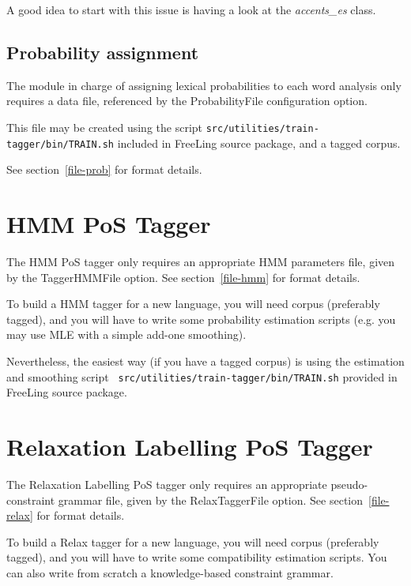 \documentclass[a4paper]{book}
\begin{document}
    A good idea to start with this issue is having a look at the 
    {\em accents\_es} class.

   \subsection{Probability assignment} 

     The module in charge of assigning lexical probabilities to each
    word analysis only requires a data file, referenced by the 
    ProbabilityFile configuration option. 

     This file may be created using the script
     {\tt src/utilities/train-tagger/bin/TRAIN.sh} included in
     FreeLing source package, and a tagged corpus.

    See section~\ref{file-prob} for format details.

  \section{HMM PoS Tagger}

   The HMM PoS tagger only requires an appropriate HMM parameters file, 
   given by the TaggerHMMFile option. See section~\ref{file-hmm}
   for format details.
 
   To build a HMM tagger for a new language, you will need corpus 
   (preferably tagged), and you will have to write some probability 
   estimation scripts (e.g. you may use MLE with a simple add-one 
   smoothing).

   Nevertheless, the easiest way (if you have a tagged corpus) is
   using the estimation and smoothing script {\tt
   src/utilities/train-tagger/bin/TRAIN.sh} provided in FreeLing source package.

  \section{Relaxation Labelling PoS Tagger}

   The Relaxation Labelling PoS tagger only requires an appropriate
   pseudo- constraint grammar file,  given by the RelaxTaggerFile
   option. See section~\ref{file-relax} for format details.

   To build a Relax tagger for a new language, you will need corpus (preferably
   tagged), and you will have to write some compatibility estimation
   scripts. You can also write from scratch a knowledge-based constraint grammar.
\end{document}
